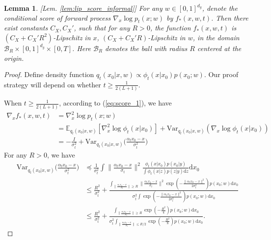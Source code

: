\documentclass{article}
\numberwithin{equation}{section}
\def\eqref#1{equation~\ref{#1}}
\newcommand{\E}{\mathbb{E}}
\newcommand{\Var}{\mathrm{Var}}
\newcommand{\dif}{\mathrm{d}}
\newtheorem{lemma}[thm]{Lemma}
\theoremstyle{definition}
\renewcommand{\eqref}[1]{(\ref{#1})}
\begin{document}
\begin{lemma}\label{lem:lip_score}[Lem. \ref{lem:lip_score_informal}]
    For any $w\in[0,1]^{d_y}$, denote the conditional score of forward process $\nabla_x\log p_t(x;w)$ by $f_*(x,w,t)$. Then there exist constants $C_X,C_X'$, such that for any $R>0$, the function $f_*(x,w,t)$ is $(C_X+C_X'R^2)$-Lipschitz in $x$, $(C_X+C_X'R)$-Lipschitz in $w$, in the domain $\mathcal{B}_R\times[0,1]^{d_y}\times [0,T]$. Here $\mathcal{B}_R$ denotes the ball with radius $R$ centered at the origin.
\end{lemma}

\begin{proof}
    Define density function $q_t(x_0|x,w)\propto \phi_t(x|x_0)p(x_0;w)$. 
    Our proof strategy will depend on whether $t\geq\frac{1}{2(L+1)}$.
    
    When $t\geq \frac{1}{2(L+1)}$, according to \eqref{eq:score_1}, we have
    \begin{equation}
        \begin{aligned}
            \nabla_xf_*(x,w,t)
            &=\nabla_x^2\log p_t(x;w) \\
            &=\E_{q_t(x_0|x,w)} \left[\nabla_x^2\log\phi_t(x|x_0)\right] + \Var_{q_t(x_0|x,w)}(\nabla_x\log\phi_t(x|x_0)) \\
            &=-\frac{I}{\sigma_t^2}+ \Var_{q_t(x_0|x,w)}\Big(\frac{\alpha_tx_0-x}{\sigma_t^2}\Big)
        \end{aligned}
    \end{equation}
    For any $R>0$, we have
    \begin{equation}
        \begin{aligned}
            \Var_{q_t(x_0|x,w)}\Big(\frac{\alpha_tx_0-x}{\sigma_t^2}\Big)
            &\preceq \frac{1}{\sigma_t^2}\int \big\|\frac{\alpha_tx_0-x}{\sigma_t}\big\|^2\frac{\phi_t(x|x_0)p(x_0|y)}{\int \phi_t(x|z)p(z|y)\dif z}\dif x_0 \\
            &\leq \frac{R^2}{\sigma_t^2} + \frac{\int_{\|\frac{\alpha_tx_0-x}{\sigma_t}\|\geq R} \|\frac{\alpha_tx_0-x}{\sigma_t}\|^2\exp\left(-\frac{\|\alpha_tx_0-x\|^2}{2\sigma_t^2}\right)p(x_0;w)\dif x_0}{\sigma_t^2\int \exp\left(-\frac{\|\alpha_tx_0-x\|^2}{2\sigma_t^2}\right)p(x_0;w)\dif x_0} \\
            &\leq \frac{R^2}{\sigma_t^2} + \frac{\int_{\|\frac{\alpha_tx_0-x}{\sigma_t}\|\geq R} \exp(-\frac{R^2}{4})p(x_0;w)\dif x_0}{\sigma_t^2\int_{\|\frac{\alpha_tx_0-x}{\sigma_t}\|\leq R/2} \exp(-\frac{R^2}{8})p(x_0;w)\dif x_0}.
        \end{aligned}

\end{equation}
\end{proof}
\end{document}
